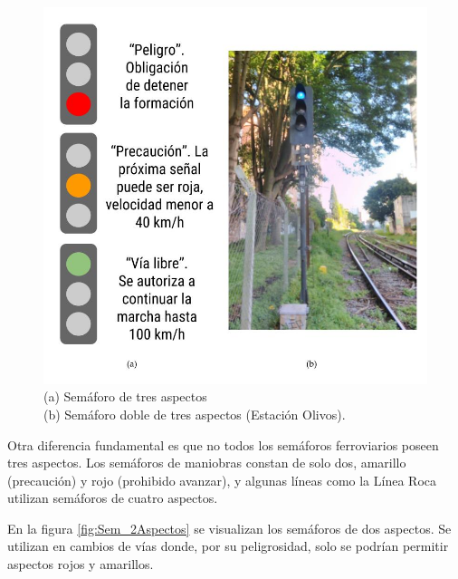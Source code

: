 			 \begin{figure}[htbp!]
				\centering
				\includegraphics[scale=.28]{./Figures/Sem3}
				\caption{(a) Semáforo de tres aspectos\\(b) Semáforo doble de tres aspectos (Estación Olivos).}
				\label{fig:Sem_3Aspectos}
			\end{figure}
			
			Otra diferencia fundamental es que no todos los semáforos ferroviarios poseen tres aspectos. Los semáforos de maniobras constan de solo dos, amarillo (precaución) y rojo (prohibido avanzar), y algunas líneas como la Línea Roca utilizan semáforos de cuatro aspectos.	
			
			En la figura \ref{fig:Sem_2Aspectos} se visualizan los semáforos de dos aspectos. Se utilizan en cambios de vías donde, por su peligrosidad, solo se podrían permitir aspectos rojos y amarillos.
			 
